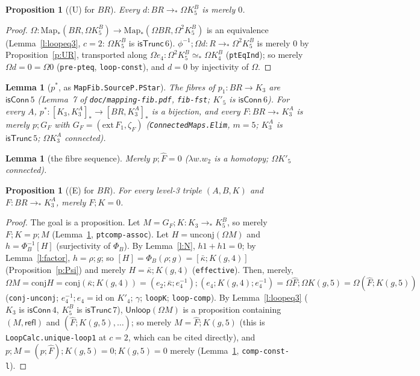 \documentclass[11pt]{amsart}
\newtheorem{proposition}[theorem]{Proposition}
\newtheorem{lemma}[theorem]{Lemma}
\theoremstyle{definition}
\theoremstyle{remark}
\newcommand{\Om}{\Omega}
\newcommand{\Map}{\mathrm{Map}_*}
\newcommand{\code}[1]{\texttt{#1}}
\newcommand{\cT}{\mathsf{isTrunc}}
\newcommand{\cC}{\mathsf{isConn}}
\newcommand{\refl}{\mathsf{refl}}
\newcommand{\lp}{\Omega}
\newcommand{\hc}[2]{[#1,#2]_*}
\newcommand{\cls}[1]{[#1]}
\newcommand{\kb}{\bar\kappa}
\newcommand{\Fh}{\hat F}
\newcommand{\Unl}{\mathsf{Unloop}}
\newcommand{\cj}{\mathrm{conj}}
\newcommand{\ucj}{\mathrm{unconj}}
\begin{document}
\begin{proposition}[(U) for $BR$]\label{p:UBR}
Every $d:BR\to_*\Om K^B_5$ is merely $0$.
\end{proposition}
\begin{proof}
$\lp:\Map(BR,\Om K^B_5)\to\Map(\Om BR,\Om^2K^B_5)$ is an equivalence
(Lemma~\ref{l:loopeq3}, $c=2$: $\Om K^B_5$ is $\cT\,6$). $\phi^{-1};\lp d:R\to_*\Om^2K^B_5$
is merely $0$ by Proposition~\ref{p:UR}, transported along
$\lp e_4:\Om^2K^B_5\simeq_*\Om K^B_4$ (\code{ptEqInd}); so merely $\lp d=0=\lp0$
(\code{pre-pteq}, \code{loop-const}), and $d=0$ by injectivity of $\lp$.
\end{proof}

\begin{lemma}[$p^*$, as \code{MapFib.SourceP.PStar}]\label{l:pstar}
The fibres of $p_1:BR\to K_3$ are $\cC\,5$ (Lemma~7 of
\code{doc/mapping-fib.pdf}, \code{fib-fst}; $K'_5$ is $\cC\,6$). For every $A$,
$p^*:\hc{K_3}{K^A_3}\to\hc{BR}{K^A_3}$ is a bijection, and every $F:BR\to_*K^A_3$
is merely $p;G_F$ with $G_F=(\mathrm{ext}\,F_1,\zeta_F)$ (\code{ConnectedMaps.Elim},
$m=5$; $K^A_3$ is $\cT\,5$; $\Om K^A_3$ connected).
\end{lemma}

\begin{lemma}[the fibre sequence]\label{l:fseq}
Merely $p;\Fh=0$ ($\lambda w.w_2$ is a homotopy; $\Om K'_5$ connected).
\end{lemma}

\begin{proposition}[(E) for $BR$]\label{p:EBR}
For every level-3 triple $(A,B,K)$ and $F:BR\to_*K^A_3$, merely $F;K=0$.
\end{proposition}
\begin{proof}
The goal is a proposition. Let $M=G_F;K:K_3\to_*K^B_5$, so merely $F;K=p;M$
(Lemma~\ref{l:pstar}, \code{ptcomp-assoc}). Let $H=\ucj(\lp M)$ and
$h=\Phi_B^{-1}\cls H$ (surjectivity of $\Phi_B$). By Lemma~\ref{l:N},
$h1+h1=0$; by Lemma~\ref{l:factor}, $h=\rho;g$; so $\cls H=\Phi_B(\rho;g)=
\cls{\kb;K(g,4)}$ (Proposition~\ref{p:Psi}) and merely $H=\kb;K(g,4)$
(\code{effective}). Then, merely,
\[\lp M=\cj H=\cj(\kb;K(g,4))=(e_2;\kb;e_4^{-1});(e_4;K(g,4);e_4^{-1})
=\lp\Fh;\lp K(g,5)=\lp(\Fh;K(g,5))\]
(\code{conj-unconj}; $e_4^{-1};e_4=\mathrm{id}$ on $K'_4$; $\gamma$; \code{loopK};
\code{loop-comp}). By Lemma~\ref{l:loopeq3} ($K_3$ is $\cC\,4$, $K^B_5$ is
$\cT\,7$), $\Unl(\lp M)$ is a proposition containing $(M,\refl)$ and
$(\Fh;K(g,5),\ldots)$; so merely $M=\Fh;K(g,5)$ (this is \code{LoopCalc.unique-loop1}
at $c=2$, which can be cited directly), and
$p;M=(p;\Fh);K(g,5)=0;K(g,5)=0$ merely (Lemma~\ref{l:fseq},
\code{comp-const-l}).
\end{proof}
\end{document}
